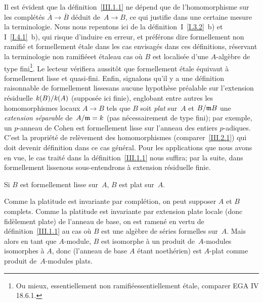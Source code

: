 \begin{remarques}
\label{III.1.2}
Il est \'evident que la d\'efinition~\ref{III.1.1} ne d\'epend
que de l'homomorphisme sur les compl\'et\'es $\overline{A} \to
\overline{B}$ d\'eduit de~$A\to B$, ce qui justifie dans une
certaine mesure la terminologie. Nous nous repentons ici de la
d\'efinition~I~\ref{I.3.2}~b) et I~\ref{I.4.1}~b), qui risque
d'induire en erreur, et pr\'ef\'erons dire \og formellement non
ramifi\'e\fg
{}et \og formellement \'etale\fg
{}dans les cas envisag\'es dans ces d\'efinitions, r\'eservant la
terminologie \og non ramifi\'ee\fg et \og \'etale\fg au cas o\`u $B$
est localis\'ee d'une $A$-alg\`ebre de type fini\footnote{Ou
mieux, \og essentiellement non ramifi\'e\fg \resp \og essentiellement
\'etale\fg, comparer EGA IV 18.6.1.}.
Le lecteur v\'erifiera aussit\^ot que \og formellement \'etale\fg
\'equivaut \`a \og formellement lisse et quasi-fini\fg. Enfin,
signalons qu'il y a une d\'efinition raisonnable de \og formellement
lisse\fg sans aucune hypoth\`ese pr\'ealable sur l'extension
r\'esiduelle
$\mathit{k}(B)/\mathit{k}(A)$
(suppos\'ee ici finie),
englobant entre autres les homomorphismes locaux $A\to B$ tels que $B$
soit \emph{plat} sur~$A$ et $B/\mathfrak{m}B$ une \emph{extension
séparable} de~$A/\mathfrak{m} =k$ (pas n\'ecessairement de type
fini); par exemple, un $p$-anneau de Cohen est formellement
lisse
sur
l'anneau des entiers $p$-adiques. C'est la propri\'et\'e de
rel\`evement des homomorphismes (comparer~\ref{III.2.1}) qui doit
devenir d\'efinition dans ce cas g\'en\'eral. Pour les
applications que nous avons en vue, le cas trait\'e dans la
d\'efinition~\ref{III.1.1} nous suffira; par la suite, dans
\og formellement lisse\fg nous sous-entendrons \og \`a extension
r\'esiduelle finie\fg.
\end{remarques}

\begin{lemme}
\label{III.1.3}
Si $B$ est formellement lisse sur~$A$, $B$ est plat sur~$A$.
\end{lemme}


Comme la platitude est invariante par compl\'etion, on peut supposer
$A$ et $B$ complets. Comme la platitude est invariante par extension
plate locale (donc fid\`element plate) de l'anneau de base, on est
ramen\'e en vertu de d\'efinition~\ref{III.1.1} au cas o\`u $B$
est une alg\`ebre de s\'eries formelles sur~$A$. Mais alors en
tant que $A$-module, $B$ est isomorphe \`a un produit de~$A$-modules
isomorphes \`a $A$, donc (l'anneau de base $A$ \'etant
noeth\'erien) est $A$-plat comme produit de~$A$-modules plats.


